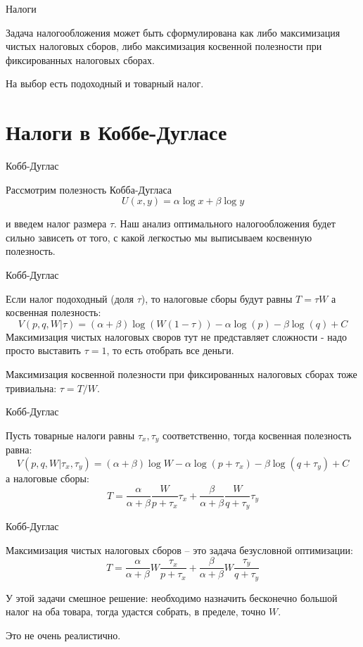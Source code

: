 \documentclass{beamer}
\begin{document}
\begin{frame}{Налоги}

Задача налогообложения может быть сформулирована как либо максимизация чистых налоговых сборов, либо максимизация косвенной полезности при фиксированных налоговых сборах. 

На выбор есть подоходный и товарный налог.

\end{frame}

\section{Налоги в Коббе-Дугласе}

\begin{frame}{Кобб-Дуглас}

Рассмотрим полезность Кобба-Дугласа 
$$U(x,y) = \alpha \log x + \beta \log y$$

и введем налог размера $\tau$. Наш анализ оптимального налогообложения будет сильно зависеть от того, с какой легкостью мы выписываем косвенную полезность.

\end{frame}

\begin{frame}{Кобб-Дуглас}

Если налог подоходный (доля $\tau$), то налоговые сборы будут равны $T = \tau W$ а косвенная полезность:
$$ V(p,q,W|\tau) = (\alpha + \beta)\log (W (1-\tau)) - \alpha \log(p) - \beta \log (q) + C$$
Максимизация чистых налоговых своров тут не представляет сложности - надо просто выставить $\tau = 1$, то есть отобрать все деньги. 

Максимизация косвенной полезности при фиксированных налоговых сборах тоже тривиальна: $\tau = T/W$.

\end{frame}

\begin{frame}{Кобб-Дуглас}

Пусть товарные налоги равны $\tau_x, \tau_y$ соответственно, тогда косвенная полезность равна:
$$V(p,q,W|\tau_x, \tau_y) = (\alpha + \beta)\log W - \alpha \log(p + \tau_x) - \beta \log (q + \tau_y) + C$$
а налоговые сборы:
$$T = \frac{\alpha}{\alpha + \beta} \frac{W}{p+\tau_x}\tau_x + \frac{\beta}{\alpha + \beta} \frac{W}{q+\tau_y} \tau_y$$

\end{frame}

\begin{frame}{Кобб-Дуглас}

Максимизация чистых налоговых сборов – это задача безусловной оптимизации:
$$T =  \frac{\alpha}{\alpha + \beta} W \frac{\tau_x}{p+\tau_x} + \frac{\beta}{\alpha + \beta} W \frac{\tau_y}{q+\tau_y}$$

У этой задачи смешное решение: необходимо назначить бесконечно большой налог на оба товара, тогда удастся собрать, в пределе, точно $W$. 

Это не очень реалистично.

\end{frame}
\end{document}
